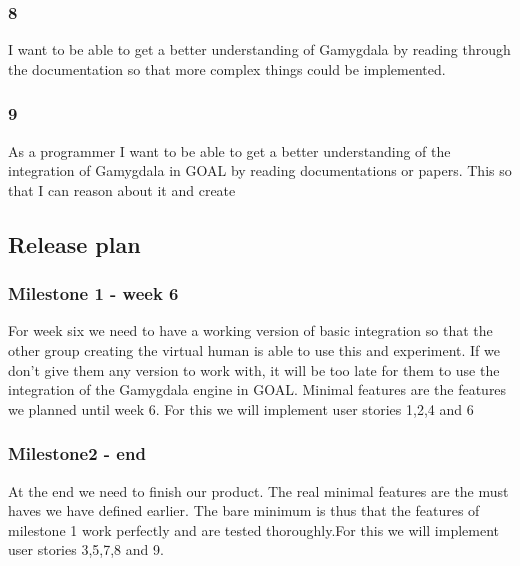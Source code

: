 \documentclass[]{article}
\begin{document}
\subsubsection*{8}
I want to be able to get a better understanding of Gamygdala by reading through the documentation so that more complex things could be implemented.

\subsubsection*{9}As a programmer I want to be able to get a better understanding of the integration of Gamygdala in GOAL by reading documentations or papers. This so that I can reason about it and create 

\subsection{Release plan}
\subsubsection{Milestone 1 - week 6}
For week six we need to have a working version of basic integration so that the other group creating the virtual human is able to use this and experiment. If we don't give them any version to work with, it will be too late for them to use the integration of the Gamygdala engine in GOAL. Minimal features are the features we planned until week 6. For this we will implement user stories 1,2,4 and 6
\subsubsection{Milestone2 - end}
At the end we need to finish our product. The real minimal features are the must haves we have defined earlier. The bare minimum is thus that the features of milestone 1 work perfectly and are tested thoroughly.For this we will implement user stories 3,5,7,8 and 9.
\pagebreak
\end{document}
